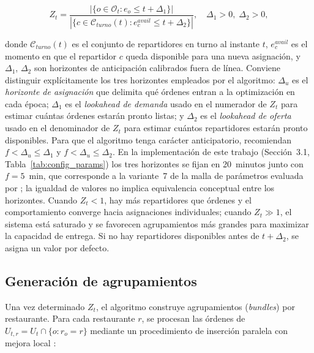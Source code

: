 \documentclass[12pt,letterpaper,oneside]{book}
\begin{document}
	\begin{equation}
		Z_t = \frac{|\{o \in \mathcal{O}_t : e_o \leq t + \Delta_1\}|}
		           {|\{c \in \mathcal{C}_{turno}(t) : e^{avail}_c \leq t + \Delta_2\}|},
		\quad \Delta_1 > 0,\; \Delta_2 > 0,
		\label{eq:zt_theory}
	\end{equation}

	\noindent donde $\mathcal{C}_{turno}(t)$ es el conjunto de repartidores en turno al instante $t$, $e^{avail}_c$ es el momento en que el repartidor $c$ queda
	disponible para una nueva asignación, y $\Delta_1$, $\Delta_2$ son
	horizontes de anticipación calibrados fuera de línea.  Conviene
	distinguir explícitamente los tres horizontes empleados por el
	algoritmo: $\Delta_u$ es el \emph{horizonte de asignación} que
	delimita qué órdenes entran a la optimización en cada época;
	$\Delta_1$ es el \emph{lookahead de demanda} usado en el numerador de
	$Z_t$ para estimar cuántas órdenes estarán pronto listas; y $\Delta_2$
	es el \emph{lookahead de oferta} usado en el denominador de $Z_t$ para
	estimar cuántos repartidores estarán pronto disponibles.  Para que el
	algoritmo tenga carácter anticipatorio, \citet{Reyes2018} recomiendan
	$f < \Delta_u \leq \Delta_1$ y $f < \Delta_u \leq \Delta_2$.  En la
	implementación de este trabajo (Sección~3.1,
	Tabla~\ref{tab:config_params}) los tres horizontes se fijan en
	20~minutos junto con $f = 5$~min, que corresponde a la variante~7 de la
	malla de parámetros evaluada por \citet{Reyes2018}; la igualdad de
	valores no implica equivalencia conceptual entre los horizontes.  Cuando $Z_t < 1$, hay más repartidores que
	órdenes y el comportamiento converge hacia asignaciones individuales;
	cuando $Z_t \gg 1$, el sistema está saturado y se favorecen
	agrupamientos más grandes para maximizar la capacidad de entrega.  Si
	no hay repartidores disponibles antes de $t + \Delta_2$, se asigna un
	valor por defecto.

	\subsection{Generación de agrupamientos}

	Una vez determinado $Z_t$, el algoritmo construye agrupamientos
	(\textit{bundles}) por restaurante.  Para cada restaurante $r$, se
	procesan las órdenes de $U_{t,r} = U_t \cap \{o : r_o = r\}$ mediante
	un procedimiento de inserción paralela con mejora local
	\citep{Reyes2018}:
\end{document}
